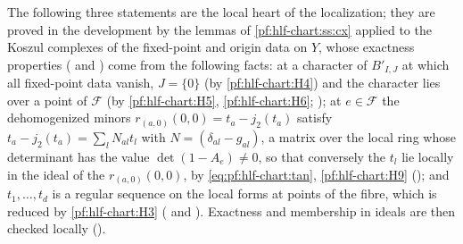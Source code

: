 The following three statements are the local heart of the localization; they are proved in the development by the lemmas of
\cref{pf:hlf-chart:ss:cx} applied to the Koszul complexes of the fixed-point and origin data on $Y$, whose exactness properties
( and ) come from the following facts:
at a character of $B'_{I,J}$ at which all fixed-point data vanish, $J=\{0\}$ (by \ref{pf:hlf-chart:H4}) and the character lies over a point of
$\mathcal F$ (by \ref{pf:hlf-chart:H5}, \ref{pf:hlf-chart:H6}; ); at $e\in\mathcal F$ the
dehomogenized minors $r_{(a,0)}(0,0)=t_a-j_2(t_a)$ satisfy $t_a-j_2(t_a)=\sum_lN_{al}t_l$ with $N=(\delta_{al}-g_{al})$, a matrix over the local ring
whose determinant has the value $\det(1-A_e)\ne0$, so that conversely the $t_l$ lie locally in the ideal of the $r_{(a,0)}(0,0)$, by
\eqref{eq:pf:hlf-chart:tan}, \ref{pf:hlf-chart:H9} (); and $t_1,\dots,t_d$ is a regular sequence on the local forms at
points of the fibre, which is reduced by \ref{pf:hlf-chart:H3} ( and ).
Exactness and membership in ideals are then checked locally ().

